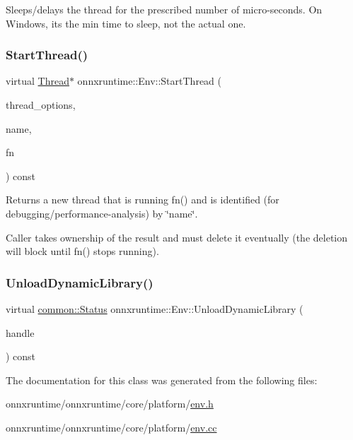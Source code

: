 Sleeps/delays the thread for the prescribed number of micro-\/seconds. On Windows, it\textquotesingle{}s the min time to sleep, not the actual one. \mbox{\label{classonnxruntime_1_1Env_a3c31e79c5ef19deafbaa10142aa4610e}} 
\subsubsection{\texorpdfstring{Start\+Thread()}{StartThread()}}
{\footnotesize\ttfamily virtual \mbox{\hyperlink{classonnxruntime_1_1Thread}{Thread}}$\ast$ onnxruntime\+::\+Env\+::\+Start\+Thread (\begin{DoxyParamCaption}\item[{const \mbox{\hyperlink{structonnxruntime_1_1ThreadOptions}{Thread\+Options}} \&}]{thread\+\_\+options,  }\item[{const std\+::string \&}]{name,  }\item[{std\+::function$<$ \mbox{\hyperlink{mlasi_8h_a88f941d423cb2a819b70a1358982b1a6}{void}}()$>$}]{fn }\end{DoxyParamCaption}) const\hspace{0.3cm}{\ttfamily [pure virtual]}}



Returns a new thread that is running fn() and is identified (for debugging/performance-\/analysis) by \char`\"{}name\char`\"{}. 

Caller takes ownership of the result and must delete it eventually (the deletion will block until fn() stops running). \mbox{\label{classonnxruntime_1_1Env_a462e73bb87bc30a18496bc311b430ede}} 
\subsubsection{\texorpdfstring{Unload\+Dynamic\+Library()}{UnloadDynamicLibrary()}}
{\footnotesize\ttfamily virtual \mbox{\hyperlink{classonnxruntime_1_1common_1_1Status}{common\+::\+Status}} onnxruntime\+::\+Env\+::\+Unload\+Dynamic\+Library (\begin{DoxyParamCaption}\item[{\mbox{\hyperlink{mlasi_8h_a88f941d423cb2a819b70a1358982b1a6}{void}} $\ast$}]{handle }\end{DoxyParamCaption}) const\hspace{0.3cm}{\ttfamily [pure virtual]}}



The documentation for this class was generated from the following files\+:\begin{DoxyCompactItemize}
\item 
onnxruntime/onnxruntime/core/platform/\mbox{\hyperlink{env_8h}{env.\+h}}\item 
onnxruntime/onnxruntime/core/platform/\mbox{\hyperlink{env_8cc}{env.\+cc}}\end{DoxyCompactItemize}
